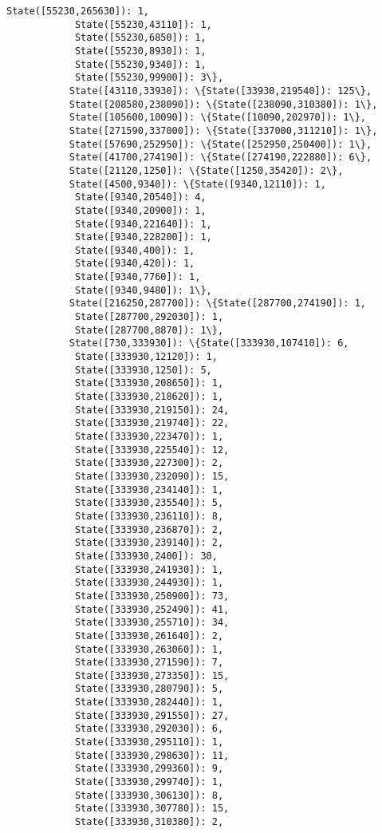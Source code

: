 \documentclass[11pt]{article}
\begin{document}
\begin{Verbatim}[commandchars=\\\{\}]
            State([55230,265630]): 1,
            State([55230,43110]): 1,
            State([55230,6850]): 1,
            State([55230,8930]): 1,
            State([55230,9340]): 1,
            State([55230,99900]): 3\},
           State([43110,33930]): \{State([33930,219540]): 125\},
           State([208580,238090]): \{State([238090,310380]): 1\},
           State([105600,10090]): \{State([10090,202970]): 1\},
           State([271590,337000]): \{State([337000,311210]): 1\},
           State([57690,252950]): \{State([252950,250400]): 1\},
           State([41700,274190]): \{State([274190,222880]): 6\},
           State([21120,1250]): \{State([1250,35420]): 2\},
           State([4500,9340]): \{State([9340,12110]): 1,
            State([9340,20540]): 4,
            State([9340,20900]): 1,
            State([9340,221640]): 1,
            State([9340,228200]): 1,
            State([9340,400]): 1,
            State([9340,420]): 1,
            State([9340,7760]): 1,
            State([9340,9480]): 1\},
           State([216250,287700]): \{State([287700,274190]): 1,
            State([287700,292030]): 1,
            State([287700,8870]): 1\},
           State([730,333930]): \{State([333930,107410]): 6,
            State([333930,12120]): 1,
            State([333930,1250]): 5,
            State([333930,208650]): 1,
            State([333930,218620]): 1,
            State([333930,219150]): 24,
            State([333930,219740]): 22,
            State([333930,223470]): 1,
            State([333930,225540]): 12,
            State([333930,227300]): 2,
            State([333930,232090]): 15,
            State([333930,234140]): 1,
            State([333930,235540]): 5,
            State([333930,236110]): 8,
            State([333930,236870]): 2,
            State([333930,239140]): 2,
            State([333930,2400]): 30,
            State([333930,241930]): 1,
            State([333930,244930]): 1,
            State([333930,250900]): 73,
            State([333930,252490]): 41,
            State([333930,255710]): 34,
            State([333930,261640]): 2,
            State([333930,263060]): 1,
            State([333930,271590]): 7,
            State([333930,273350]): 15,
            State([333930,280790]): 5,
            State([333930,282440]): 1,
            State([333930,291550]): 27,
            State([333930,292030]): 6,
            State([333930,295110]): 1,
            State([333930,298630]): 11,
            State([333930,299360]): 9,
            State([333930,299740]): 1,
            State([333930,306130]): 8,
            State([333930,307780]): 15,
            State([333930,310380]): 2,

\end{Verbatim}
\end{document}
